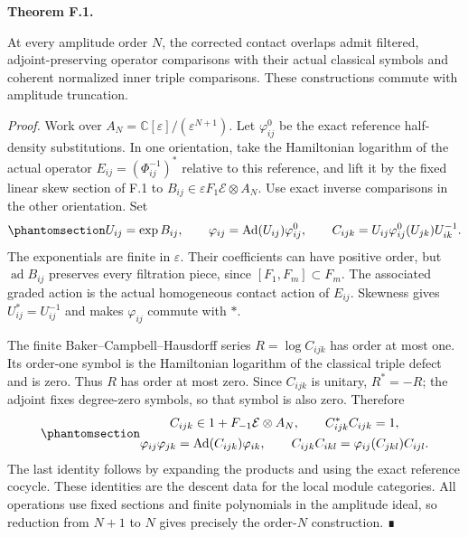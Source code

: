 \documentclass[
  english,
  11pt,
  reqno]{amsart}
\makeatletter
\newcommand{\pandocstatementheading}[1]{%
  \par\addpenalty{\@beginparpenalty}%
  \addvspace{.5\baselineskip plus .2\baselineskip minus .2\baselineskip}%
  {\normalfont\bfseries #1\par}%
  \nobreak\@afterindenttrue\@afterheading
}
\makeatother
\begin{document}
\pandocstatementheading{\protect{}\label{thm:gg-op-finite-descent}Theorem F.1.}

At every amplitude order \(N\), the corrected contact overlaps admit
filtered, adjoint-preserving operator comparisons with their actual
classical symbols and coherent normalized inner triple comparisons.
These constructions commute with amplitude truncation.

\emph{Proof.} Work over
\(A_N=\mathbb C[\varepsilon]/(\varepsilon^{N+1})\). Let
\(\varphi^0_{ij}\) be the exact reference half-density substitutions. In
one orientation, take the Hamiltonian logarithm of the actual operator
\(E_{ij}=(\Phi_{ij}^{-1})^*\) relative to this reference, and lift it by
the fixed linear skew section of F.1 to
\(B_{ij}\in\varepsilon F_1\mathcal E\otimes A_N\). Use exact inverse
comparisons in the other orientation. Set
\begin{equation}\protect\phantomsection\label{eq:gg-op-finite-comparisons}{
 U_{ij}=\exp B_{ij},\qquad
 \varphi_{ij}=\operatorname{Ad}(U_{ij})\varphi^0_{ij},
 \qquad
 C_{ijk}=U_{ij}\varphi^0_{ij}(U_{jk})U_{ik}^{-1}.
}\end{equation} The exponentials are finite in \(\varepsilon\). Their
coefficients can have positive order, but \(\operatorname{ad}B_{ij}\)
preserves every filtration piece, since \([F_1,F_m]\subset F_m\). The
associated graded action is the actual homogeneous contact action of
\(E_{ij}\). Skewness gives \(U_{ij}^*=U_{ij}^{-1}\) and makes
\(\varphi_{ij}\) commute with \(*\).

The finite Baker--Campbell--Hausdorff series \(R=\log C_{ijk}\) has
order at most one. Its order-one symbol is the Hamiltonian logarithm of
the classical triple defect and is zero. Thus \(R\) has order at most
zero. Since \(C_{ijk}\) is unitary, \(R^*=-R\); the adjoint fixes
degree-zero symbols, so that symbol is also zero. Therefore
\begin{equation}\protect\phantomsection\label{eq:gg-op-coherence}{
 \begin{gathered}
 C_{ijk}\in1+F_{-1}\mathcal E\otimes A_N,\qquad
 C_{ijk}^*C_{ijk}=1,\\
 \varphi_{ij}\varphi_{jk}
        =\operatorname{Ad}(C_{ijk})\varphi_{ik},\qquad
 C_{ijk}C_{ikl}
        =\varphi_{ij}(C_{jkl})C_{ijl}.
 \end{gathered}
}\end{equation} The last identity follows by expanding the products and
using the exact reference cocycle. These identities are the descent data
for the local module categories. All operations use fixed sections and
finite polynomials in the amplitude ideal, so reduction from \(N+1\) to
\(N\) gives precisely the order-\(N\) construction. ∎
\end{document}
